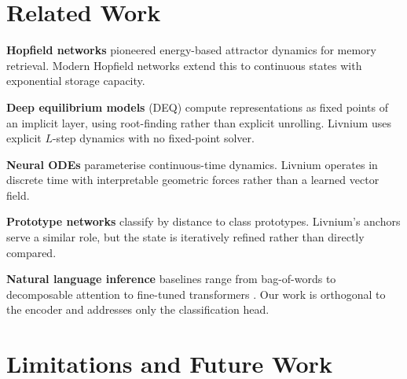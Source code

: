 \documentclass[11pt]{article}
\begin{document}
\section{Related Work}
\label{sec:related}

\textbf{Hopfield networks} \citep{hopfield1982} pioneered energy-based
attractor dynamics for memory retrieval. Modern Hopfield networks
\citep{ramsauer2020hopfield} extend this to continuous states with
exponential storage capacity.

\textbf{Deep equilibrium models} (DEQ) \citep{bai2019deep} compute
representations as fixed points of an implicit layer, using root-finding
rather than explicit unrolling. Livnium uses explicit $L$-step dynamics
with no fixed-point solver.

\textbf{Neural ODEs} \citep{chen2018neural} parameterise continuous-time
dynamics. Livnium operates in discrete time with interpretable geometric
forces rather than a learned vector field.

\textbf{Prototype networks} \citep{snell2017prototypical} classify by
distance to class prototypes. Livnium's anchors serve a similar role,
but the state is iteratively refined rather than directly compared.

\textbf{Natural language inference} baselines range from
bag-of-words \citep{bowman2015snli} to decomposable attention
\citep{parikh2016decomposable} to fine-tuned transformers
\citep{devlin2019bert}. Our work is orthogonal to the encoder and
addresses only the classification head.

\section{Limitations and Future Work}
\label{sec:limitations}
\end{document}
